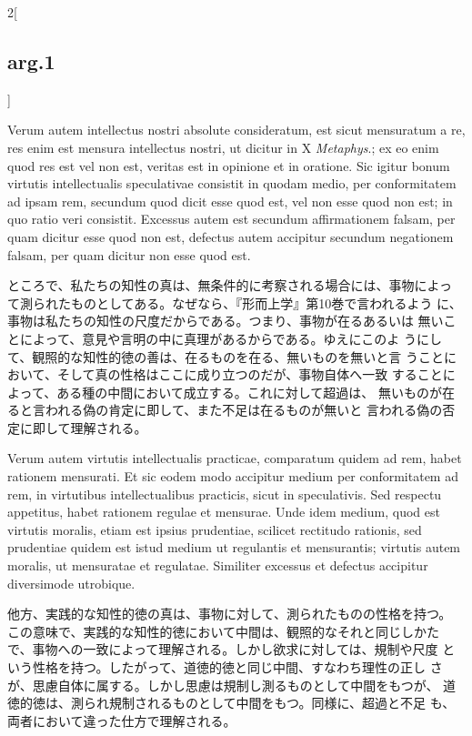 \documentclass[paper=a4paper,fontsize=10pt,jafontsize=9pt,titlepage]{jlreq}
\begin{document}
\begin{paracol}{2}[\subsection{arg.1}]
\switchcolumn*

Verum autem intellectus nostri absolute consideratum, est sicut
 mensuratum a re, res enim est mensura intellectus nostri, ut dicitur
 in X {\itshape Metaphys}.; ex eo enim quod res est vel non est,
 veritas est in opinione et in oratione. Sic igitur bonum virtutis
 intellectualis speculativae consistit in quodam medio, per
 conformitatem ad ipsam rem, secundum quod dicit esse quod est, vel
 non esse quod non est; in quo ratio veri consistit. Excessus autem
 est secundum affirmationem falsam, per quam dicitur esse quod non
 est, defectus autem accipitur secundum negationem falsam, per quam
 dicitur non esse quod est.

\switchcolumn

ところで、私たちの知性の真は、無条件的に考察される場合には、事物によっ
 て測られたものとしてある。なぜなら、『形而上学』第10巻で言われるよう
 に、事物は私たちの知性の尺度だからである。つまり、事物が在るあるいは
 無いことによって、意見や言明の中に真理があるからである。ゆえにこのよ
 うにして、観照的な知性的徳の善は、在るものを在る、無いものを無いと言
 うことにおいて、そして真の性格はここに成り立つのだが、事物自体へ一致
 することによって、ある種の中間において成立する。これに対して超過は、
 無いものが在ると言われる偽の肯定に即して、また不足は在るものが無いと
 言われる偽の否定に即して理解される。

\switchcolumn*

Verum autem virtutis intellectualis practicae, comparatum quidem ad
 rem, habet rationem mensurati. Et sic eodem modo accipitur medium per
 conformitatem ad rem, in virtutibus intellectualibus practicis, sicut
 in speculativis. Sed respectu appetitus, habet rationem regulae et
 mensurae. Unde idem medium, quod est virtutis moralis, etiam est
 ipsius prudentiae, scilicet rectitudo rationis, sed prudentiae quidem
 est istud medium ut regulantis et mensurantis; virtutis autem
 moralis, ut mensuratae et regulatae. Similiter excessus et defectus
 accipitur diversimode utrobique.

\switchcolumn

他方、実践的な知性的徳の真は、事物に対して、測られたものの性格を持つ。
 この意味で、実践的な知性的徳において中間は、観照的なそれと同じしかた
 で、事物への一致によって理解される。しかし欲求に対しては、規制や尺度
 という性格を持つ。したがって、道徳的徳と同じ中間、すなわち理性の正し
 さが、思慮自体に属する。しかし思慮は規制し測るものとして中間をもつが、
 道徳的徳は、測られ規制されるものとして中間をもつ。同様に、超過と不足
 も、両者において違った仕方で理解される。


\end{paracol}
\end{document}
